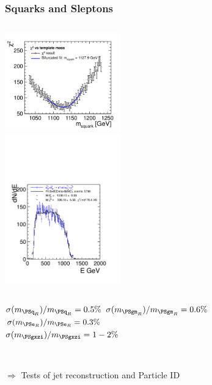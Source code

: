 \documentclass{beamer}
\begin{document}
\begin{frame}
\frametitle{Squarks and Sleptons}
\begin{columns}[c]
\column{6cm}
\centering
\includegraphics[width=5cm]{TemplateFit_Chi2SquarkMass.pdf}\\
\column{6cm}
\centering
\includegraphics[width=5cm]{202_H1LPADC4.pdf}
\end{columns}
\begin{columns}[c]
\column{6cm}
\centering
$\sigma(m_{\PSq_{R}})/m_{\PSq_{R}}=0.5\%$
\column{6cm}
\centering
$\sigma(m_{\PSgm_{R}})/m_{\PSgm_{R}} = 0.6\%$\\
$\sigma(m_{\PSe_{R}})/m_{\PSe_{R}} = 0.3\%$\\
$\sigma(m_{\PSgxzi})/m_{\PSgxzi} = 1-2\%$
\end{columns}
~\\
$\Rightarrow$ Tests of jet reconstruction and Particle ID
\end{frame}
\end{document}

